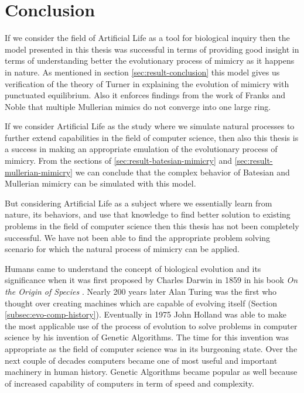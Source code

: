 \chapter{Conclusion}
\label{chapter:conclusion}
If we consider the field of Artificial Life as a tool for biological inquiry then the model presented in this thesis was successful in terms of providing good insight in terms of understanding better the evolutionary process of mimicry as it happens in nature. As mentioned in section \ref{sec:result-conclusion} this model gives us verification of the theory of Turner in explaining the evolution of mimicry with punctuated equilibrium. Also it enforces findings from the work of Franks and Noble that multiple Mullerian mimics do not converge into one large ring.

If we consider Artificial Life as the study where we simulate natural processes to further extend capabilities in the field of computer science, then also this thesis is a success in making an appropriate emulation of the evolutionary process of mimicry. From the sections of \ref{sec:result-batesian-mimicry} and \ref{sec:result-mullerian-mimicry} we can conclude that the complex behavior of Batesian and Mullerian mimicry can be simulated with this model.

But considering Artificial Life as a subject where we essentially learn from nature, its behaviors, and use that knowledge to find better solution to existing problems in the field of computer science then this thesis has not been completely successful. We have not been able to find the appropriate problem solving scenario for which the natural process of mimicry can be applied.

Humans came to understand the concept of biological evolution and its significance when it was first proposed by Charles Darwin in 1859 in his book \textsl{On the Origin of Species} \cite{darwin1859}. Nearly 200 years later Alan Turing was the first who thought over creating machines which are capable of evolving itself (Section \ref{subsec:evo-comp-history}). Eventually in 1975 John Holland was able to make the most applicable use of the process of evolution to solve problems in computer science by his invention of Genetic Algorithms. The time for this invention was appropriate as the field of computer science was in its burgeoning state. Over the next couple of decades computers became one of most useful and important machinery in human history. Genetic Algorithms became popular as well because of increased capability of computers in term of speed and complexity.  

